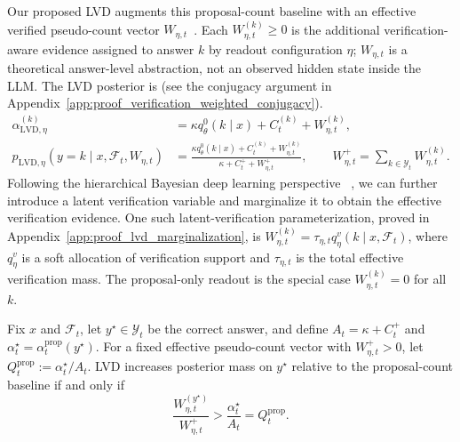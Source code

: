 \documentclass{article}
\newcommand{\appref}[1]{Appendix~\ref{#1}}
\begin{document}
Our proposed LVD augments this proposal-count baseline with an effective verified
pseudo-count vector $W_{\eta,t}$~\cite{VIR}. Each $W_{\eta,t}^{(k)}\ge 0$ is the additional
verification-aware evidence assigned to answer $k$ by readout configuration
$\eta$; $W_{\eta,t}$ is a theoretical answer-level abstraction, not an observed
hidden state inside the LLM. The LVD posterior is (see the conjugacy argument in
\appref{app:proof_verification_weighted_conjugacy}).
\begin{equation}
\begin{aligned}
    \alpha_{\mathrm{LVD},\eta}^{(k)}
    &=\kappa q_\theta^0(k\mid x)+C_t^{(k)}+W_{\eta,t}^{(k)},\\
    p_{\mathrm{LVD},\eta}(y=k\mid x,\mathcal F_t,W_{\eta,t})
    &=\frac{\kappa q_\theta^0(k\mid x)+C_t^{(k)}+W_{\eta,t}^{(k)}}
    {\kappa+C_t^+ + W_{\eta,t}^+},
    \qquad
    W_{\eta,t}^+=\sum\nolimits_{k\in\mathcal Y_t}W_{\eta,t}^{(k)}.
    \label{eq:lvd_posterior}
\end{aligned}
\end{equation}
Following the hierarchical Bayesian deep learning perspective
~\citep{BDL,BDLSurvey,NPN}, we can further introduce a latent verification
variable and marginalize it to obtain the effective verification evidence.
One such latent-verification
parameterization, proved in \appref{app:proof_lvd_marginalization}, is
$W_{\eta,t}^{(k)}=\tau_{\eta,t}q_\eta^v(k\mid x,\mathcal F_t)$, where
$q_\eta^v$ is a soft allocation of verification support and $\tau_{\eta,t}$ is
the total effective verification mass. The proposal-only readout is the special
case $W_{\eta,t}^{(k)}=0$ for all $k$.

\begin{proposition}
\label{prop:verification_directed_drift}
Fix $x$ and $\mathcal F_t$, let $y^\star\in\mathcal Y_t$ be the correct answer,
and define $A_t=\kappa+C_t^+$ and
$\alpha_t^\star=\alpha_t^{\mathrm{prop}}(y^\star)$. For a fixed effective
pseudo-count vector with $W_{\eta,t}^+>0$, let
$Q_t^{\mathrm{prop}}:=\alpha_t^\star/A_t$. LVD increases posterior mass on
$y^\star$ relative to the proposal-count baseline if and only if
\begin{equation}
    \frac{W_{\eta,t}^{(y^\star)}}{W_{\eta,t}^+}
    >
    \frac{\alpha_t^\star}{A_t}
    =
    Q_t^{\mathrm{prop}}.
    \label{eq:lvd_positive_drift_ratio}
\end{equation}
\end{proposition}
\end{document}
